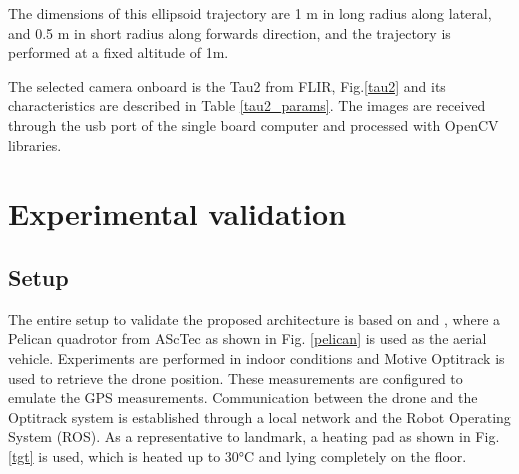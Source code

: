 \documentclass[conference]{IEEEtran}
\begin{document}
The dimensions of this ellipsoid trajectory are 1 m in long radius along lateral, and 0.5 m in short radius along forwards direction, and the trajectory is performed at a fixed altitude of 1m.

The selected camera onboard is the Tau2 from FLIR\textregistered, Fig.\ref{tau2} and its characteristics are described in Table \ref{tau2_params}. The images are received through the usb port of the single board computer and processed with OpenCV libraries. 

\begin{table}
\small\sf\centering
\caption{Tau2 camera intrinsic parameters and dimensions}
\label{tau2_params}
\end{table}

\section{Experimental validation}
\subsection{Setup}
The entire setup to validate the proposed architecture is based on \cite{DenaRuiz2017_1} and \cite{DenaRuiz2017_2}, where a Pelican quadrotor from AScTec as shown in Fig. \ref{pelican} is used as the aerial vehicle. Experiments are performed in indoor conditions and Motive Optitrack is used to retrieve the drone position. These measurements are configured to emulate the GPS measurements. Communication between the drone and the Optitrack system is established through a local network and the Robot Operating System (ROS). As a representative to landmark, a heating pad as shown in Fig.\ref{tgt} is used, which is heated up to 30°C and lying completely on the floor.
\end{document}
